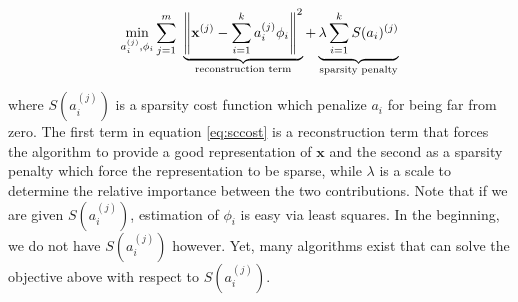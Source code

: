 %
%

\begin{equation}
\min_{a_i^{(j)},\phi_i}\sum_{j=1}^m
\ \underbrace{\norm{\mathbf{x}^{(j)}-\sum_{i=1}^ka_i^{(j)}\phi_i}^2}_{\text{reconstruction term}}+\underbrace{\lambda \sum_{i=1}^k
S(a_i)^{(j)}}_{\text{sparsity penalty}}
\label{eq:sccost}
\end{equation}

where $S(a_i^{(j)})$ is a sparsity cost function which penalize $a_i$ for being far from zero.
The first term in equation \ref{eq:sccost} is a reconstruction term that forces the algorithm to provide a good representation of $\mathbf{x}$ and the second as a sparsity penalty which force the representation to be sparse, while $\lambda$ is a scale to determine the relative importance between the two contributions. Note that if we are given $S(a_i^{(j)})$, estimation of $\phi_i$ is easy via least squares. In the beginning, we do not have $S(a_i^{(j)})$ however. Yet, many algorithms exist that can solve the objective above with respect to $S(a_i^{(j)})$. 

